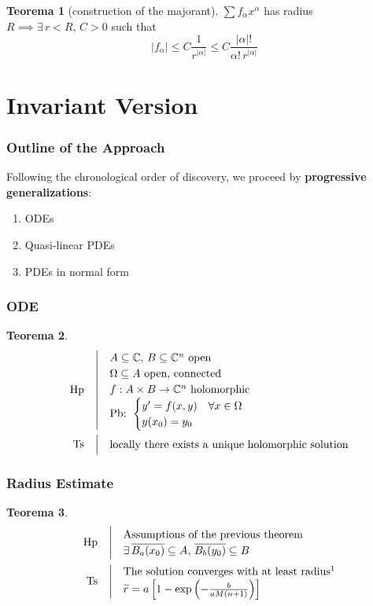 \documentclass[serif,notheorems]{beamer}
\makeatletter
\newenvironment{ipotesi}%
{\quad\left|\quad\def\arraystretch{1.2}\begin{array}{@{}l@{}}}%
{\end{array}\right.}
\newcommand{\hpth}[2]
{
\begin{align*}
\quad
\text{Hp}
&\begin{ipotesi}
#1
\end{ipotesi}\\
\text{Ts}
&\begin{ipotesi}
#2
\end{ipotesi}
\end{align*}
}
\theoremstyle{definition} %
\newtheorem{theorem}{Teorema}[section] %
\theoremstyle{remark}
\makeatother
\begin{document}
\begin{frame}
\begin{theorem}[construction of the majorant]
$\sum f_\alpha x^\alpha$ has radius $R \implies \exists \, r<R, \, C>0$ such that 
$$|f_\alpha | \leq C \frac{1}{r^{|\alpha |}} \leq C \frac{|\alpha |!}{\alpha ! \, r^{|\alpha |}}$$
\end{theorem}
\end{frame}

\section{Invariant Version}

\begin{frame}
\frametitle{Outline of the Approach}
Following the chronological order of discovery, we proceed by \textbf{progressive generalizations}:
\begin{enumerate}
\item ODEs
\item Quasi-linear PDEs
\item PDEs in normal form
\end{enumerate}
\end{frame}

\begin{frame}
\frametitle{ODE}
\begin{theorem}
\hpth{
A \subseteq \mathbb{C}, \, B\subseteq \mathbb{C}^n \text{ open }\\
\Omega \subseteq A \text{ open, connected}\\
f:A\times B\rightarrow\mathbb{C}^n \text{ holomorphic}\\
\text{Pb: }
\begin{cases}
y' = f(x,y) \quad \forall x \in \Omega \\
y(x_0)=y_0
\end{cases}\\
}
{
\text{locally there exists a unique holomorphic solution}
}
\end{theorem}
\end{frame}

\begin{frame}
\frametitle{Radius Estimate}
\begin{theorem}
\hpth{
\text{Assumptions of the previous theorem}\\
\exists \, \overline{B_a(x_0)}\subseteq A,\,\overline{B_b(y_0)} \subseteq B\\
}{
\text{The solution converges with at least radius}\footnotemark \\
\widetilde{r}= a\left[ 1-\exp\left( -\frac{b}{aM(n+1)}\right) \right] \\
}
\end{theorem}
\end{frame}
\end{document}
